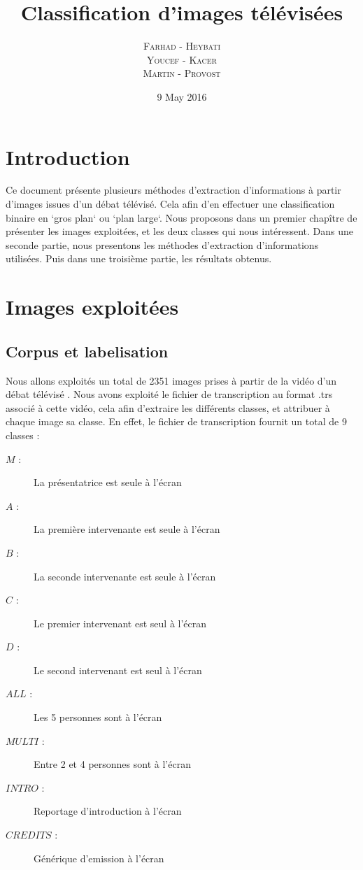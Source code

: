 \documentclass{book}
\title{Classification d'images télévisées}
\author{\textsc{Farhad} - \textsc{Heybati}\\
\textsc{Youcef} - \textsc{Kacer}\\
\textsc{Martin} - \textsc{Provost}}
\date{9 May 2016}
\begin{document}
 
\maketitle

\tableofcontents

\frontmatter
\chapter{Introduction}
Ce document présente plusieurs méthodes d'extraction d'informations à partir d'images issues d'un débat télévisé.
Cela afin d'en effectuer une classification binaire en `gros plan` ou `plan large`.
Nous proposons dans un premier chapître de présenter les images exploitées, et les deux classes qui nous intéressent.
Dans une seconde partie, nous presentons les méthodes d'extraction d'informations utilisées.
Puis dans une troisième partie, les résultats obtenus.

\mainmatter
\chapter{Images exploitées}
\section{Corpus et labelisation}
Nous allons exploités un total de 2351 images prises à partir de la vidéo d'un débat télévisé \cite{ref} .
Nous avons exploité le fichier de transcription au format .trs \cite{ref} associé à cette vidéo, cela afin d'extraire les différents classes, et attribuer à chaque image sa classe.
En effet, le fichier de transcription fournit un total de 9 classes :

\begin{description} %

\item[$M$ :] La présentatrice est seule à l'écran
\item[$A$ :] La première intervenante est seule à l'écran
\item[$B$ :] La seconde intervenante est seule à l'écran
\item[$C$ :] Le premier intervenant est seul à l'écran
\item[$D$ :] Le second intervenant est seul à l'écran
\item[$ALL$ :] Les 5 personnes sont à l'écran
\item[$MULTI$ :] Entre 2 et 4 personnes sont à l'écran
\item[$INTRO$ :] Reportage d'introduction à l'écran
\item[$CREDITS$ :] Générique d'emission à l'écran

\end{description}
\end{document}
